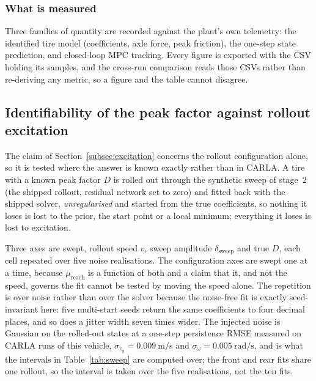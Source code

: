 \subsubsection{What is measured}
Three families of quantity are recorded against the plant's own telemetry: the
identified tire model (coefficients, axle force, peak friction), the one-step
state prediction, and closed-loop MPC tracking. Every figure is exported with
the CSV holding its samples, and the cross-run comparison reads those CSVs
rather than re-deriving any metric, so a figure and the table cannot disagree.

\subsection{Identifiability of the peak factor against rollout excitation}
\label{subsec:sweep}

The claim of Section~\ref{subsec:excitation} concerns the rollout
configuration alone, so it is tested where the answer is known exactly rather
than in CARLA. A tire with a known peak factor $D$ is rolled out through the
synthetic sweep of stage~2 (the shipped rollout, residual network set to zero)
and fitted back with the shipped solver, \emph{unregularised} and started from
the true coefficients, so nothing it loses is lost to the prior, the start
point or a local minimum; everything it loses is lost to excitation.

Three axes are swept, rollout speed $v$, sweep amplitude
$\delta_{\mathrm{sweep}}$ and true $D$, each cell repeated over five noise
realisations. The configuration axes are swept one at a time, because
$\mu_{\mathrm{reach}}$ is a function of both and a claim that it, and not the
speed, governs the fit cannot be tested by moving the speed alone. The
repetition is over noise rather than over the solver because the noise-free fit
is exactly seed-invariant here: five multi-start seeds return the same
coefficients to four decimal places, and so does a jitter width seven times
wider. The injected noise is Gaussian on the rolled-out states at a one-step
persistence RMSE measured on CARLA runs of this vehicle,
$\sigma_{v_{y}}=\SI{0.009}{\meter\per\second}$ and
$\sigma_{\omega}=\SI{0.005}{\radian\per\second}$, and is what the intervals in
Table~\ref{tab:sweep} are computed over; the front and rear fits share one
rollout, so the interval is taken over the five realisations, not the ten fits.

